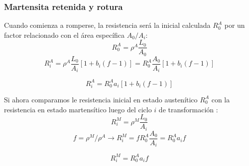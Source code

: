 \documentclass[usenames,dvipsnames]{beamer}
\begin{document}
\begin{frame}
 \frametitle{Martensita retenida y rotura}
 
Cuando comienza a romperse, la resistencia será la inicial calculada $R^A_0$ por un factor relacionado con el área específica $A_0/A_i$:
\begin{equation*}
 R^A _0 = \rho^A \frac{L_0}{A_0}
\end{equation*}
\begin{equation*}
 R^A _i =\rho^A \frac{L_0}{A_i} [1+ b_i (f-1)]= R^A _0 \frac{A_0}{A_i} [1+b_i (f-1)]  %
\end{equation*}

\begin{block}{
 \begin{equation*}
 R^A _i = R^A _0 a_i [1+b_i (f-1)] 
 \end{equation*}
 }
\end{block}


\end{frame}

\begin{frame}

Si ahora comparamos le resistencia inicial en estado austenítico $R^A _0$ con la resistencia en estado martensítico luego del ciclo $i$ de transformación :
\begin{equation*}
 R^M _i = \rho ^M \frac{L_0}{A_i}
\end{equation*}
\begin{equation*}
 f=\rho^M / \rho^A \longrightarrow
 R^M _i = f R^A _0 \frac{A_0}{A_i} = R^A _0 a_i f 
\end{equation*}

\begin{block}{
\begin{equation*}
 R^M _i  = R^A _0 a_i f
\end{equation*}
 }
\end{block}

\end{frame}

\end{document}
